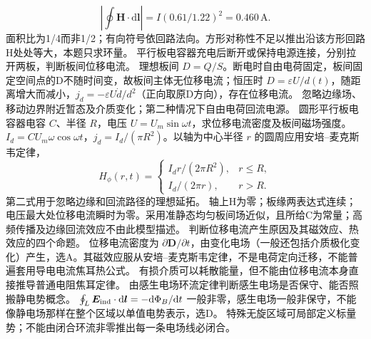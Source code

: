 \[
\left|\oint\bm H\cdot\mathrm d\bm l\right|
=I(0.61/1.22)^2=0.460\,\mathrm A.
\]
\crosscheck 面积比为1/4而非1/2；有向符号依回路法向。方形对称性不足以推出沿该方形回路H处处等大，本题只求环量。
\problemtext 平行板电容器充电后断开或保持电源连接，分别拉开两板，判断板间位移电流。
\workings 理想板间 $D=Q/S$。断电时自由电荷固定，板间固定空间点的D不随时间变，故板间主体无位移电流；恒压时 $D=\varepsilon U/d(t)$，随距离增大而减小，$j_d=-\varepsilon U\dot d/d^2$（正向取原D方向），存在位移电流。
\crosscheck 忽略边缘场、移动边界附近暂态及介质变化；第二种情况下自由电荷回流电源。
\problemtext 圆形平行板电容器电容 $C$、半径 $R$，电压 $U=U_m\sin\omega t$，求位移电流密度及板间磁场强度。
\workings $I_d=C U_m\omega\cos\omega t$，$j_d=I_d/(\pi R^2)$。以轴为中心半径 $r$ 的圆周应用安培--麦克斯韦定律，
\[
H_\phi(r,t)=\begin{cases}I_d r/(2\pi R^2),&r\le R,\\I_d/(2\pi r),&r>R.\end{cases}
\]
第二式用于忽略边缘和回流路径的理想延拓。
\crosscheck 轴上H为零；板缘两表达式连续；电压最大处位移电流瞬时为零。采用准静态均匀板间场近似，且所给C为常量；高频传播及边缘回流效应不由此模型描述。
\problemtext 判断位移电流产生原因及其磁效应、热效应的四个命题。
\workings 位移电流密度为 $\partial\bm D/\partial t$，由变化电场（一般还包括介质极化变化）产生，选A。其磁效应服从安培--麦克斯韦定律，不是电荷定向迁移，不能普遍套用导电电流焦耳热公式。
\crosscheck 有损介质可以耗散能量，但不能由位移电流本身直接推导普通电阻焦耳定律。
\problemtext 由感生电场环流定律判断感生电场是否保守、能否照搬静电势概念。
\workings $\oint_L\bm E_{\rm ind}\cdot\mathrm d\bm l=-\mathrm d\Phi_B/\mathrm dt$ 一般非零，感生电场一般非保守，不能像静电场那样在整个区域以单值电势表示，选D。
\crosscheck 特殊无旋区域可局部定义标量势；不能由闭合环流非零推出每一条电场线必闭合。
